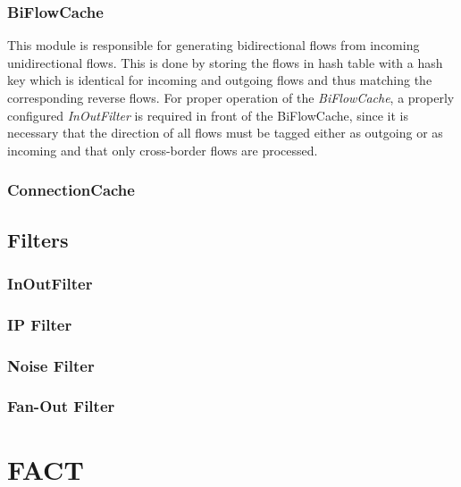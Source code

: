 \subsubsection{BiFlowCache} This module is responsible for generating
bidirectional flows from incoming unidirectional flows. This is done by
storing the flows in hash table with a hash key which is identical for incoming
and outgoing flows and thus matching the corresponding reverse flows. For proper operation of the \emph{BiFlowCache}, a properly configured \emph{InOutFilter} is required in front of the BiFlowCache, since it is necessary that the direction of all flows must be tagged either as outgoing or as incoming and that only cross-border flows are processed.

\subsubsection{ConnectionCache}

\subsection{Filters}
\subsubsection{InOutFilter}
\subsubsection{IP Filter} 
\subsubsection{Noise Filter} 
\subsubsection{Fan-Out Filter}

\section{FACT}
